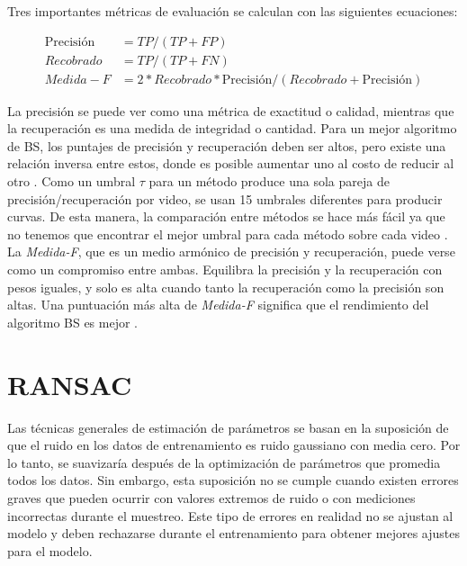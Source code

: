 Tres importantes métricas de evaluación se calculan con las siguientes ecuaciones:

\begin{equation*}
    \begin{split}
        \text{Precisión} & = TP/(TP + FP)\\
        Recobrado & = TP/(TP + FN)\\
        Medida-F & =  2 * Recobrado * \text{Precisión}/(Recobrado + \text{Precisión})
    \end{split}
\end{equation*}

La precisión se puede ver como una métrica de exactitud o calidad, mientras que la recuperación es una medida de integridad o cantidad. Para un mejor algoritmo de BS, los puntajes de precisión y recuperación deben ser altos, pero existe una relación inversa entre estos, donde es posible aumentar uno al costo de reducir al otro \cite{GuangleTaoJiandanPingWenwu}. Como un umbral $\tau$ para un método produce una sola pareja de precisión/recuperación por video, se usan 15 umbrales diferentes para producir curvas. De esta manera, la comparación entre métodos se hace más fácil ya que no tenemos que encontrar el mejor umbral para cada método sobre cada video \cite{YannickPierreMarcBrunoHeleneChristophe}. La \textit{Medida-F}, que es un medio armónico de precisión y recuperación, puede verse como un compromiso entre ambas. Equilibra la precisión y la recuperación con pesos iguales, y solo es alta cuando tanto la recuperación como la precisión son altas. Una puntuación más alta de \textit{Medida-F} significa que el rendimiento del algoritmo BS es mejor \cite{GuangleTaoJiandanPingWenwu}.

\section{RANSAC}

Las técnicas generales de estimación de parámetros se basan en la suposición de que el ruido en los datos de entrenamiento es ruido gaussiano con media cero. Por lo tanto, se suavizaría después de la optimización de parámetros que promedia todos los datos. Sin embargo, esta suposición no se cumple cuando existen errores graves que pueden ocurrir con valores extremos de ruido o con mediciones incorrectas durante el muestreo. Este tipo de errores en realidad no se ajustan al modelo y deben rechazarse durante el entrenamiento para obtener mejores ajustes para el modelo.

